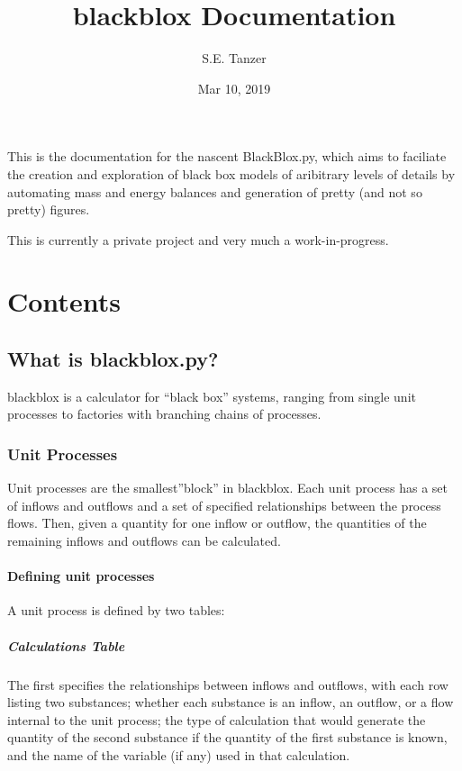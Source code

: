 \documentclass[a4paper,10pt,english]{sphinxmanual}
\title{blackblox Documentation}
\date{Mar 10, 2019}
\author{S.E. Tanzer}
\begin{document}
\pagestyle{empty}
\sphinxmaketitle
\pagestyle{plain}
\sphinxtableofcontents
\pagestyle{normal}
\label{\detokenize{index::doc}}


This is the documentation for the nascent BlackBlox.py, which aims to faciliate
the creation and exploration of black box models of aribitrary levels of details
by automating mass and energy balances and generation of pretty (and not so pretty)
figures.

This is currently a private project and very much a work-in-progress.


\chapter{Contents}
\label{\detokenize{index:contents}}

\section{What is blackblox.py?}
\label{\detokenize{intro:what-is-blackblox-py}}\label{\detokenize{intro::doc}}
blackblox is a calculator for “black box” systems, ranging from single unit processes to factories with branching chains of processes.



\subsection{Unit Processes}
\label{\detokenize{intro:unit-processes}}
Unit processes are the smallest”block” in blackblox. Each unit process has a set of inflows and outflows and a set of specified relationships between the process flows. Then, given a quantity for one inflow or outflow, the quantities of the remaining inflows and outflows can be calculated.


\subsubsection{Defining unit processes}
\label{\detokenize{intro:defining-unit-processes}}
A unit process is defined by two tables:


\paragraph{Calculations Table}
\label{\detokenize{intro:calculations-table}}
The first specifies the relationships between inflows and outflows, with each row listing two substances; whether each substance is an inflow, an outflow, or a flow internal to the unit process; the type of calculation that would generate the quantity of the second substance if the quantity of the first substance is known, and the name of the variable (if any) used in that calculation.
\end{document}
